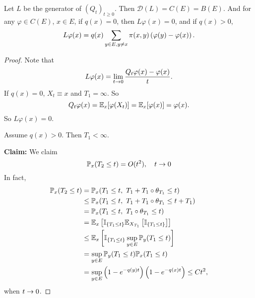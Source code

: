 \begin{prop}
    Let $L$ be the generator of $(Q_t)_{t \geq 0}$. Then $\mathcal{D}(L) = C(E) = B(E)$. And for any $\varphi \in C(E)$, $x \in E$, if $q(x) = 0$, then $L\varphi(x) = 0$, and if $q(x) > 0$,
    \begin{equation*}
        L \varphi (x) = q(x)\sum_{y \in E,y\neq x}\pi(x,y)\left(\varphi(y) - \varphi(x)\right).
    \end{equation*}
\end{prop}
\begin{proof}
    Note that
    \begin{equation*}
        L\varphi(x) = \lim_{t \rightarrow 0} \frac{Q_t \varphi(x) - \varphi(x)}{t}.
    \end{equation*}
    If $q(x) = 0$, $X_t \equiv x$ and $T_1 = \infty$. So
    \begin{equation*}
        Q_t \varphi(x) = \mathbb{E}_x[\varphi(X_t)] = \mathbb{E}_x[\varphi(x)] = \varphi(x).
    \end{equation*}
    So $L\varphi(x) = 0$.

    \noindent Assume $q(x) > 0$. Then $T_1 < \infty$.

    \noindent \textbf{Claim:} We claim
    \begin{equation*}
        \mathbb{P}_x(T_2 \leq t) = O(t^2),\quad t \rightarrow 0
    \end{equation*}
    In fact, 
    \begin{align*}
        \mathbb{P}_x(T_2 \leq t) &= \mathbb{P}_x(T_1 \leq t,~ T_1 + T_1 \circ \theta_{T_1} \leq t) \\
        &\leq \mathbb{P}_x(T_1 \leq t,~ T_1 + T_1 \circ \theta_{T_1} \leq t + T_1) \\
        &= \mathbb{P}_x(T_1 \leq t,~ T_1 \circ \theta_{T_1} \leq t) \\
        &= \mathbb{E}_x\left[\mathbb{I}_{\left\{T_1 \leq t\right\}} \mathbb{E}_{X_{T_1}}\left[\mathbb{I}_{\left\{ T_1 \leq t \right\}}\right]\right] \\
        &\leq \mathbb{E}_x\left[\mathbb{I}_{\left\{T_1 \leq t\right\}} \sup_{y \in E} \mathbb{P}_y(T_1 \leq t)\right] \\
        &= \sup_{y \in E} \mathbb{P}_y(T_1 \leq t)\mathbb{P}_x(T_1 \leq t) \\
        &= \sup _{y \in E}\left(1-e^{-q(y) t}\right)\left(1-e^{-q(x) t}\right) \leq Ct^2,
    \end{align*}
    when $t \rightarrow 0$.


\end{proof}
